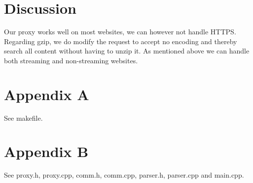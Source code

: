 \documentclass[10pt]{article}
\begin{document}
\section{Discussion}
Our proxy works well on most websites, we can however not handle HTTPS.
Regarding gzip, we do modify the request to accept no encoding and thereby
search all content without having to unzip it. As mentioned above we can
handle both streaming and non-streaming websites.

\section*{Appendix A}
See makefile.

\section*{Appendix B}
See proxy.h, proxy.cpp, comm.h, comm.cpp, parser.h, parser.cpp and main.cpp.
\end{document}
